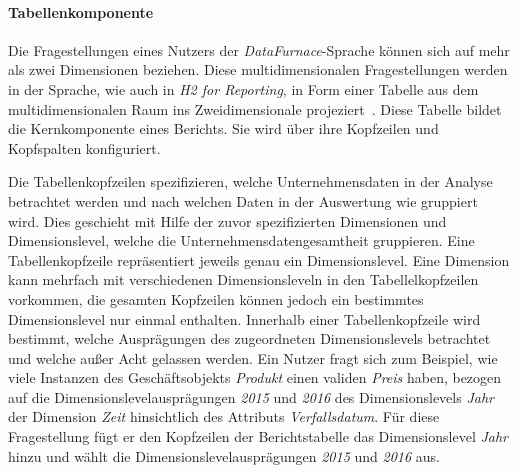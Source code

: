 \documentclass[
  language=german, %
  type=bachelor%
]{isthesis}
\begin{document}
\begin{content}
  \paragraph{Tabellenkomponente}\label{paragraph:tabellenkomponente} 
  Die Fragestellungen eines Nutzers der \textit{DataFurnace}-Sprache können
  sich auf mehr als zwei Dimensionen beziehen. Diese multidimensionalen
  Fragestellungen werden in der Sprache, wie auch in \textit{H2 for Reporting},
  in Form einer Tabelle aus dem multidimensionalen Raum ins Zweidimensionale
  projeziert~\cite[][S.  23]{becker2007h2}. Diese Tabelle bildet die
  Kernkomponente eines Berichts.  Sie wird über ihre Kopfzeilen und Kopfspalten
  konfiguriert.

  Die Tabellenkopfzeilen spezifizieren, welche Unternehmensdaten in der Analyse
  betrachtet werden und nach welchen Daten in der Auswertung wie gruppiert wird. Dies
  geschieht mit Hilfe der zuvor spezifizierten Dimensionen und Dimensionslevel,
  welche die Unternehmensdatengesamtheit gruppieren. Eine Tabellenkopfzeile
  repräsentiert jeweils genau ein Dimensionslevel. Eine Dimension kann mehrfach
  mit verschiedenen Dimensionsleveln in den Tabellelkopfzeilen vorkommen, die gesamten
  Kopfzeilen können jedoch ein bestimmtes Dimensionslevel nur einmal enthalten.
  Innerhalb einer Tabellenkopfzeile wird bestimmt, welche Ausprägungen des
  zugeordneten Dimensionslevels betrachtet und welche außer Acht gelassen
  werden. Ein Nutzer fragt sich zum Beispiel, wie viele Instanzen des
  Geschäftsobjekts \textit{Produkt} einen validen \textit{Preis} haben, bezogen
  auf die Dimensionslevelausprägungen \textit{2015} und \textit{2016} des
  Dimensionslevels \textit{Jahr} der Dimension \textit{Zeit} hinsichtlich des
  Attributs \textit{Verfallsdatum}. Für diese Fragestellung fügt er den
  Kopfzeilen der Berichtstabelle das Dimensionslevel \textit{Jahr} hinzu und
  wählt die Dimensionslevelausprägungen \textit{2015} und \textit{2016} aus.


\end{content}
\end{document}
